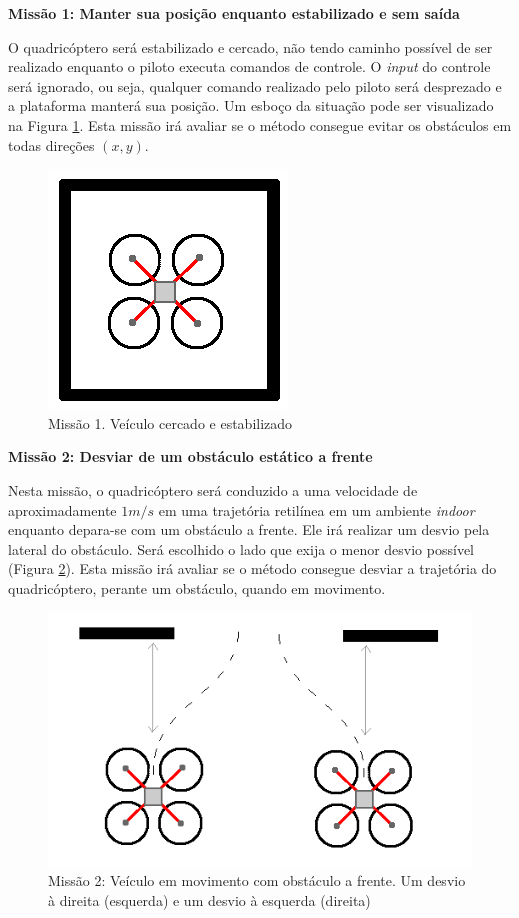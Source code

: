 \documentclass[a4paper, 12pt]{article}
\begin{document}
 \noindent\textbf{Missão 1: Manter sua posição enquanto estabilizado e sem saída}
 
 O quadricóptero será estabilizado e cercado, não tendo caminho possível de ser realizado enquanto o piloto executa comandos de controle. O \textit{input} do controle será ignorado, ou seja, qualquer comando realizado pelo piloto será desprezado e a plataforma manterá sua posição. Um esboço da situação pode ser visualizado na Figura \ref{fig:missao1}. Esta missão irá avaliar se o método consegue evitar os obstáculos em todas direções $(x,y)$.
 
 \begin{figure}[h]
 	\centering
 	\includegraphics[scale=0.5]{img/missao1.png}
 	\caption{Missão 1. Veículo cercado e estabilizado}
 	\label{fig:missao1}
 \end{figure}  
 
 \noindent\textbf{Missão 2: Desviar de um obstáculo estático a frente}
 
 Nesta missão, o quadricóptero será conduzido a uma velocidade de aproximadamente $1m/s$ em uma trajetória retilínea em um ambiente \textit{indoor} enquanto depara-se com um obstáculo a frente. Ele irá realizar um desvio pela lateral do obstáculo. Será escolhido o lado que exija o menor desvio possível (Figura \ref{fig:missao2}). Esta missão irá avaliar se o método consegue desviar a trajetória do quadricóptero, perante um obstáculo, quando em movimento.

\begin{figure}[h]
	\centering
	\includegraphics[scale=0.5]{img/missao2.png}
	\caption{Missão 2: Veículo em movimento com obstáculo a frente. Um desvio à direita (esquerda) e um desvio à esquerda (direita)}
	\label{fig:missao2}
\end{figure}  
 
\end{document}
